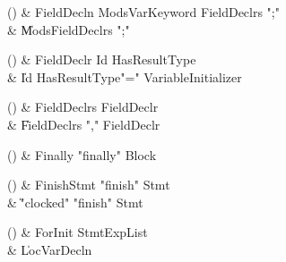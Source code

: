 \begin{bbgrammarappendix}{4.0in}

() & FieldDecln \label{prod:FieldDecln}  \: Mods\opt VarKeyword FieldDeclrs \xcd";"  \\

 &    \| Mods\opt FieldDeclrs \xcd";" \\

\end{bbgrammarappendix}

\begin{bbgrammarappendix}{4.0in}

() & FieldDeclr \label{prod:FieldDeclr}  \: Id HasResultType  \\

 &    \| Id HasResultType\opt \xcd"=" VariableInitializer \\

\end{bbgrammarappendix}

\begin{bbgrammarappendix}{3.9in}

() & FieldDeclrs \label{prod:FieldDeclrs}  \: FieldDeclr  \\

 &    \| FieldDeclrs \xcd"," FieldDeclr \\

\end{bbgrammarappendix}

\begin{bbgrammarappendix}{4.3in}

() & Finally \label{prod:Finally}  \: \xcd"finally" Block  \\


\end{bbgrammarappendix}

\begin{bbgrammarappendix}{4.0in}

() & FinishStmt \label{prod:FinishStmt}  \: \xcd"finish" Stmt  \\

 &    \| \xcd"clocked" \xcd"finish" Stmt \\

\end{bbgrammarappendix}

\begin{bbgrammarappendix}{4.3in}

() & ForInit \label{prod:ForInit}  \: StmtExpList  \\

 &    \| LocVarDecln \\

\end{bbgrammarappendix}

